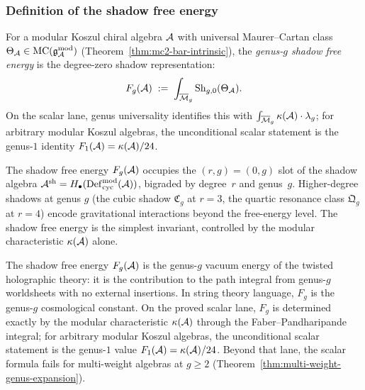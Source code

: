 \subsubsection{Definition of the shadow free energy}

\begin{definition}
\label{def:thqg-I-shadow-free-energy}
For a modular Koszul chiral algebra $\mathcal{A}$ with universal Maurer--Cartan class $\Theta_{\mathcal{A}} \in \mathrm{MC}(\mathfrak{g}_{\mathcal{A}}^{\mathrm{mod}})$ (Theorem~\ref{thm:mc2-bar-intrinsic}), the \emph{genus-$g$ shadow free energy} is the degree-zero shadow representation:
\begin{equation}\label{eq:thqg-I-Fg-def}
F_g(\mathcal{A}) \;:=\; \int_{\overline{\mathcal{M}}_g} \operatorname{Sh}_{g,0}(\Theta_{\mathcal{A}}).
\end{equation}
On the scalar lane, genus universality identifies this
with $\int_{\overline{\mathcal{M}}_g} \kappa(\mathcal{A})\cdot\lambda_g$; for
arbitrary modular Koszul algebras, the unconditional scalar statement
is the genus-$1$ identity $F_1(\mathcal{A})=\kappa(\mathcal{A})/24$.
\end{definition}

\begin{remark}
\label{rem:thqg-I-shadow-algebra-relation}
The shadow free energy $F_g(\mathcal{A})$ occupies the $(r,g) = (0,g)$ slot of the shadow algebra $\mathcal{A}^{\mathrm{sh}} = H_\bullet(\operatorname{Def}_{\mathrm{cyc}}^{\mathrm{mod}}(\mathcal{A}))$, bigraded by degree~$r$ and genus~$g$. Higher-degree shadows at genus $g$ (the cubic shadow $\mathfrak{C}_g$ at $r = 3$, the quartic resonance class $\mathfrak{Q}_g$ at $r = 4$) encode gravitational interactions beyond the free-energy level. The shadow free energy is the simplest invariant, controlled by the modular characteristic $\kappa(\mathcal{A})$ alone.
\end{remark}

\begin{remark}
\label{rem:thqg-I-vacuum-energy}
The shadow free energy $F_g(\mathcal{A})$ is the genus-$g$ vacuum energy of the
twisted holographic theory: it is the contribution to the path integral
from genus-$g$ worldsheets with no external insertions. In string
theory language, $F_g$ is the genus-$g$ cosmological constant. On the
proved scalar lane, $F_g$ is determined exactly by the modular
characteristic $\kappa(\mathcal{A})$ through the Faber--Pandharipande integral;
for arbitrary modular Koszul algebras, the unconditional scalar
statement is the genus-$1$ value $F_1(\mathcal{A})=\kappa(\mathcal{A})/24$. Beyond that
lane, the scalar formula fails for multi-weight algebras at
$g \geq 2$ (Theorem~\ref{thm:multi-weight-genus-expansion}).
\end{remark}

